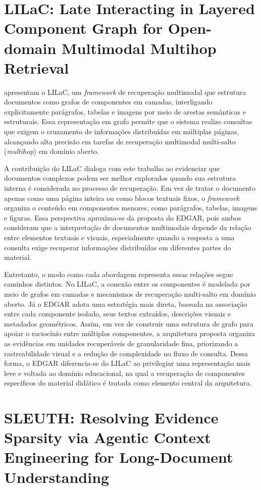 \section{LILaC: Late Interacting in Layered Component Graph for Open-domain Multimodal Multihop Retrieval}
\label{sec:lilac}

 apresentam o LILaC, um \textit{framework} de recuperação multimodal que estrutura documentos como grafos de componentes em camadas, interligando explicitamente parágrafos, tabelas e imagens por meio de arestas semânticas e estruturais. Essa representação em grafo permite que o sistema realize consultas que exigem o cruzamento de informações distribuídas em múltiplas páginas, alcançando alta precisão em tarefas de recuperação multimodal multi-salto (\textit{multihop}) em domínio aberto.

A contribuição do LILaC dialoga com este trabalho ao evidenciar que documentos complexos podem ser melhor explorados quando sua estrutura interna é considerada no processo de recuperação. Em vez de tratar o documento apenas como uma página inteira ou como blocos textuais fixos, o \textit{framework} organiza o conteúdo em componentes menores, como parágrafos, tabelas, imagens e figuras. Essa perspectiva aproxima-se da proposta do EDGAR, pois ambos consideram que a interpretação de documentos multimodais depende da relação entre elementos textuais e visuais, especialmente quando a resposta a uma consulta exige recuperar informações distribuídas em diferentes partes do material.

Entretanto, o modo como cada abordagem representa essas relações segue caminhos distintos. No LILaC, a conexão entre os componentes é modelada por meio de grafos em camadas e mecanismos de recuperação multi-salto em domínio aberto. Já o EDGAR adota uma estratégia mais direta, baseada na associação entre cada componente isolado, seus textos extraídos, descrições visuais e metadados geométricos. Assim, em vez de construir uma estrutura de grafo para apoiar o raciocínio entre múltiplos componentes, a arquitetura proposta organiza as evidências em unidades recuperáveis de granularidade fina, priorizando a rastreabilidade visual e a redução de complexidade no fluxo de consulta. Dessa forma, o EDGAR diferencia-se do LILaC ao privilegiar uma representação mais leve e voltada ao domínio educacional, na qual a recuperação de componentes específicos do material didático é tratada como elemento central da arquitetura.

\section{SLEUTH: Resolving Evidence Sparsity via Agentic Context Engineering for Long-Document Understanding}
\label{sec:sleuth}

